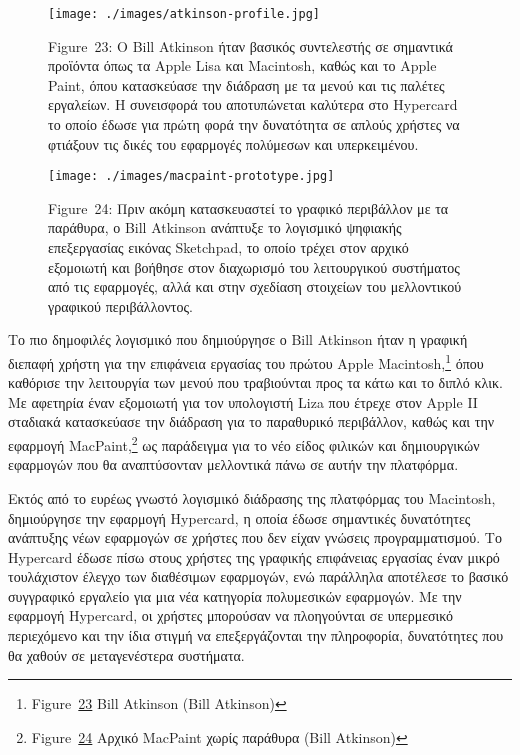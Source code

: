 \documentclass[
]{article}
\begin{document}
\leavevmode{}%
\begin{figure}
\hypertarget{fig:atkinson-profile}{%
\centering
\texttt{[image: ./images/atkinson-profile.jpg]}
\caption{Figure~23: Ο Bill Atkinson ήταν βασικός συντελεστής σε
σημαντικά προϊόντα όπως τα Apple Lisa και Macintosh, καθώς και το Apple
Paint, όπου κατασκεύασε την διάδραση με τα μενού και τις παλέτες
εργαλείων. Η συνεισφορά του αποτυπώνεται καλύτερα στο Hypercard το οποίο
έδωσε για πρώτη φορά την δυνατότητα σε απλούς χρήστες να φτιάξουν τις
δικές του εφαρμογές πολύμεσων και
υπερκειμένου.}\label{fig:atkinson-profile}
}
\end{figure}

\leavevmode{}%
\begin{figure}
\hypertarget{fig:macpaint-prototype}{%
\centering
\texttt{[image: ./images/macpaint-prototype.jpg]}
\caption{Figure~24: Πριν ακόμη κατασκευαστεί το γραφικό περιβάλλον με τα
παράθυρα, ο Bill Atkinson ανάπτυξε το λογισμικό ψηφιακής επεξεργασίας
εικόνας Sketchpad, το οποίο τρέχει στον αρχικό εξομοιωτή και βοήθησε
στον διαχωρισμό του λειτουργικού συστήματος από τις εφαρμογές, αλλά και
στην σχεδίαση στοιχείων του μελλοντικού γραφικού
περιβάλλοντος.}\label{fig:macpaint-prototype}
}
\end{figure}

Το πιο δημοφιλές λογισμικό που δημιούργησε ο Bill Atkinson ήταν η
γραφική διεπαφή χρήστη για την επιφάνεια εργασίας του πρώτου Apple
Macintosh,\footnote{Figure~\protect\hyperlink{fig:atkinson-profile}{23}
  Bill Atkinson (Bill Atkinson)} όπου καθόρισε την λειτουργία των μενού
που τραβιούνται προς τα κάτω και το διπλό κλικ. Με αφετηρία έναν
εξομοιωτή για τον υπολογιστή Liza που έτρεχε στον Apple II σταδιακά
κατασκεύασε την διάδραση για το παραθυρικό περιβάλλον, καθώς και την
εφαρμογή MacPaint,\footnote{Figure~\protect\hyperlink{fig:macpaint-prototype}{24}
  Αρχικό MacPaint χωρίς παράθυρα (Bill Atkinson)} ως παράδειγμα για το
νέο είδος φιλικών και δημιουργικών εφαρμογών που θα αναπτύσονταν
μελλοντικά πάνω σε αυτήν την πλατφόρμα.

Εκτός από το ευρέως γνωστό λογισμικό διάδρασης της πλατφόρμας του
Macintosh, δημιούργησε την εφαρμογή Hypercard, η οποία έδωσε σημαντικές
δυνατότητες ανάπτυξης νέων εφαρμογών σε χρήστες που δεν είχαν γνώσεις
προγραμματισμού. Το Hypercard έδωσε πίσω στους χρήστες της γραφικής
επιφάνειας εργασίας έναν μικρό τουλάχιστον έλεγχο των διαθέσιμων
εφαρμογών, ενώ παράλληλα αποτέλεσε το βασικό συγγραφικό εργαλείο για μια
νέα κατηγορία πολυμεσικών εφαρμογών. Με την εφαρμογή Hypercard, οι
χρήστες μπορούσαν να πλοηγούνται σε υπερμεσικό περιεχόμενο και την ίδια
στιγμή να επεξεργάζονται την πληροφορία, δυνατότητες που θα χαθούν σε
μεταγενέστερα συστήματα.
\end{document}
